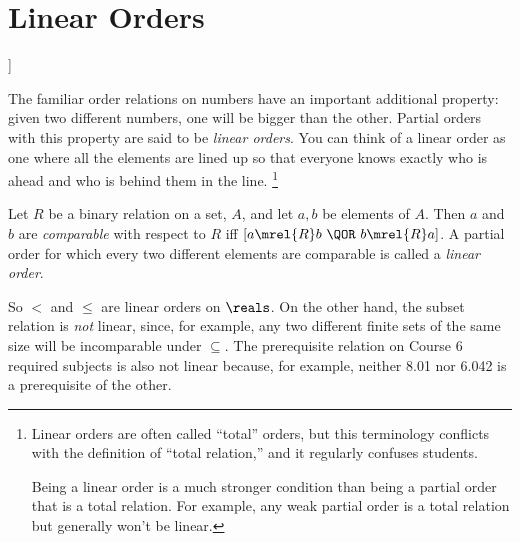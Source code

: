 
\section{Linear Orders}]\label{linear_order_sec}

The familiar order relations on numbers have an important additional
property: given two different numbers, one will be bigger than the
other.  Partial orders with this property are said to be \emph{linear
  orders}.  You can think of a linear order as one where all the
elements are lined up so that everyone knows exactly who is ahead and
who is behind them in the line.
\footnote{Linear orders are often called ``total'' orders, but this
  terminology conflicts with the definition of ``total relation,'' and
  it regularly confuses students.

  Being a linear order is a much stronger condition than being a
  partial order that is a total relation.  For example, any weak
  partial order is a total relation but generally won't be linear.}

\begin{definition}\label{def:path_total}
Let $R$ be a binary relation on a set, $A$, and let $a, b$ be elements of
$A$.  Then $a$ and $b$ are \emph{comparable} with respect to $R$ iff $[a
  \mrel{R} b\ \QOR\ b \mrel{R} a]$.  A partial order for which every two
different elements are comparable is called a \emph{linear order}.
\end{definition}

So $<$ and $\le$ are linear orders on $\reals$.  On the other hand, the
subset relation is \emph{not} linear, since, for example, any two different
finite sets of the same size will be incomparable under $\subseteq$.  The
prerequisite relation on Course 6 required subjects is also not linear
because, for example, neither 8.01 nor 6.042 is a prerequisite of the
other.

\iffalse
The name linear is based on the following
\begin{lemma}\label{path_total_lem} For any
  finite, nonempty set of vertices from a linear order, there is
  a directed path going through exactly these vertices.  If
  the digraph is a DAG, the directed path is unique.
\end{lemma}
Lemma~\ref{path_total_lem} is easy to prove by induction on the size
of the set of vertices.  The proof is given in
Problem~\ref{CP_tournament_chain}.
\fi

